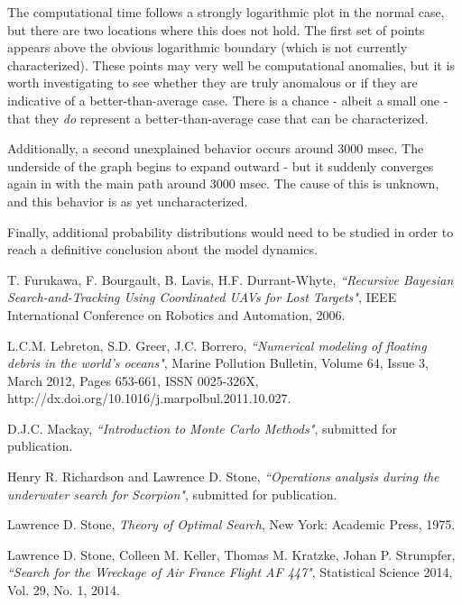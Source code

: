 \documentclass[a4paper]{article}
\begin{document}
The computational time follows a strongly logarithmic plot in the normal case, but there are two locations where this does not hold. The first set of points appears above the obvious logarithmic boundary (which is not currently characterized). These points may very well be computational anomalies, but it is worth investigating to see whether they are truly anomalous or if they are indicative of a better-than-average case. There is a chance - albeit a small one - that they \textit{do} represent a better-than-average case that can be characterized. 

Additionally, a second unexplained behavior occurs around 3000 msec. The underside of the graph begins to expand outward - but it suddenly converges again in with the main path around 3000 msec. The cause of this is unknown, and this behavior is as yet uncharacterized. 

Finally, additional probability distributions would need to be studied in order to reach a definitive conclusion about the model dynamics.

\pagebreak

\begin{thebibliography}{10}
 T. Furukawa, F. Bourgault, B. Lavis, H.F. Durrant-Whyte, \emph{``Recursive Bayesian Search-and-Tracking Using Coordinated UAVs for Lost Targets"}, IEEE International Conference on Robotics and Automation, 2006. 


 L.C.M. Lebreton, S.D. Greer, J.C. Borrero, \emph{``Numerical modeling of floating debris in the world’s oceans"}, Marine Pollution Bulletin, Volume 64, Issue 3, March 2012, Pages 653-661, ISSN 0025-326X, http://dx.doi.org/10.1016/j.marpolbul.2011.10.027.

 D.J.C. Mackay, \emph{``Introduction to Monte Carlo Methods"}, submitted for publication.

 Henry R. Richardson and Lawrence D. Stone, \emph{``Operations analysis during the underwater search for Scorpion"}, submitted for publication. 

 Lawrence D. Stone, \textit{Theory of Optimal Search}, New York: Academic Press, 1975.

 Lawrence D. Stone, Colleen M. Keller, Thomas M. Kratzke, Johan P. Strumpfer, \emph{``Search for the Wreckage of Air France Flight AF 447"}, Statistical Science 2014, Vol. 29, No. 1, 2014.
\end{thebibliography}
\end{document}
